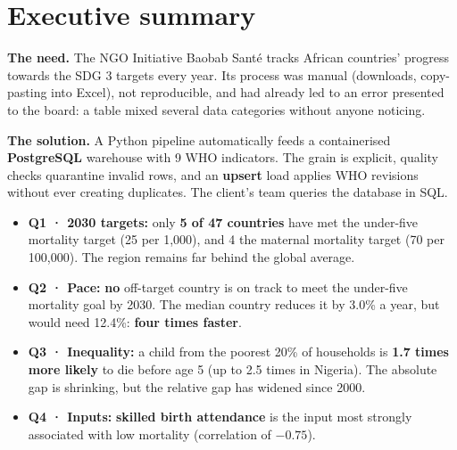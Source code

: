 \documentclass[11pt, a4paper, oneside, headings=normal, numbers=noenddot, DIV=12]{scrartcl}
\begin{document}
\begingroup
{}
\setcounter{tocdepth}{2}
\tableofcontents
\endgroup
\clearpage

\section{Executive summary}\label{sec:summary}

\textbf{The need.} The NGO Initiative Baobab Santé tracks African countries' progress towards the SDG 3 targets every year.
Its process was manual (downloads, copy-pasting into Excel), not reproducible, and had already led to an error presented to the board:
a table mixed several data categories without anyone noticing.

\textbf{The solution.} A Python pipeline automatically feeds a containerised \textbf{PostgreSQL} warehouse with 9 WHO indicators.
The grain is explicit, quality checks quarantine invalid rows, and an \textbf{upsert} load applies WHO revisions without ever creating
duplicates. The client's team queries the database in SQL.


\begin{keybox}
\begin{itemize}[leftmargin=1.2em]
  \item \textbf{Q1 · 2030 targets:} only \textbf{5 of 47 countries} have met the under-five mortality target (25 per 1,000), and 4 the maternal
        mortality target (70 per 100,000). The region remains far behind the global average.
  \item \textbf{Q2 · Pace:} \textbf{no} off-target country is on track to meet the under-five mortality goal by 2030. The median country
        reduces it by 3.0\% a year, but would need 12.4\%: \textbf{four times faster}.
  \item \textbf{Q3 · Inequality:} a child from the poorest 20\% of households is \textbf{1.7 times more likely} to die before age 5
        (up to 2.5 times in Nigeria). The absolute gap is shrinking, but the relative gap has widened since 2000.
  \item \textbf{Q4 · Inputs:} \textbf{skilled birth attendance} is the input most strongly associated with low mortality (correlation of $-0.75$).
\end{itemize}
\end{keybox}
\end{document}
